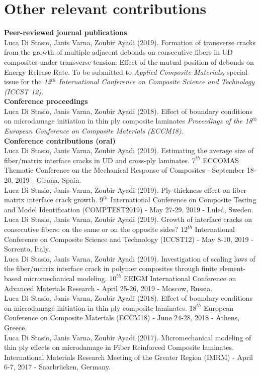 \section*{Other relevant contributions}
\textbf{Peer-reviewed journal publications}\\[10pt]
Luca Di Stasio, Janis Varna, Zoubir Ayadi (2019). Formation of transverse cracks from the growth of multiple adjacent debonds on consecutive fibers in UD composites under transverse tension: Effect of the mutual position of debonds on Energy Release Rate. To be submitted to \textit{Applied Composite Materials}, special issue for the \textit{12$^{th}$ International Conference on Composite Science and Technology (ICCST 12)}.\\[12.5pt]
\textbf{Conference proceedings}\\[10pt]
Luca Di Stasio, Janis Varna, Zoubir Ayadi (2018). Effect of boundary conditions on microdamage initiation in thin ply composite laminates \textit{Proceedings of the 18$^{th}$ European Conference on Composite Materials (ECCM18)}.\\[12.5pt]
\textbf{Conference contributions (oral)}\\[10pt]
Luca Di Stasio, Janis Varna, Zoubir Ayadi (2019). Estimating the average size of fiber/matrix interface cracks in UD and cross-ply laminates. $7^{th}$ ECCOMAS Thematic Conference on the Mechanical Response of Composites - September 18-20, 2019 - Girona, Spain.\\[10pt]
Luca Di Stasio, Janis Varna, Zoubir Ayadi (2019). Ply-thickness effect on fiber-matrix interface crack growth. $9^{th}$ International Conference on Composite Testing and Model Identification (COMPTEST2019) - May 27-29, 2019 - Lule\aa, Sweden.\\[10pt]
Luca Di Stasio, Janis Varna, Zoubir Ayadi (2019). Growth of interface cracks on consecutive fibers: on the same or on the opposite sides? $12^{th}$ International Conference on Composite Science and Technology (ICCST12) - May 8-10, 2019 - Sorrento, Italy.\\[10pt]
Luca Di Stasio, Janis Varna, Zoubir Ayadi (2019). Investigation of scaling laws of the fiber/matrix interface crack in polymer composites through finite element-based micromechanical modeling. $10^{th}$ EEIGM International Conference on Advanced Materials Research - April 25-26, 2019 - Moscow, Russia.\\[10pt]
Luca Di Stasio, Janis Varna, Zoubir Ayadi (2018). Effect of boundary conditions on microdamage initiation in thin ply composite laminates. $18^{th}$ European Conference on Composite Materials (ECCM18) - June 24-28, 2018 - Athens, Greece.\\[10pt]
Luca Di Stasio, Janis Varna, Zoubir Ayadi (2017). Micromechanical modeling of thin ply effects on microdamage in Fiber Reinforced Composite laminates. International Materials Research Meeting of the Greater Region (IMRM) - April 6-7, 2017 - Saarbr\"ucken, Germany.
